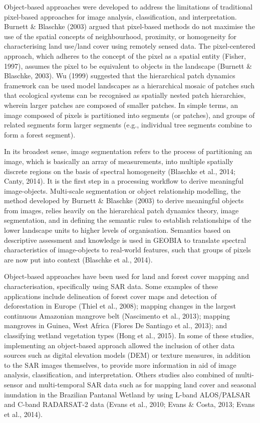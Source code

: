 Object-based approaches were developed to address the limitations of traditional pixel-based approaches for image analysis, classification, and interpretation. Burnett \& Blaschke (2003) argued that pixel-based methods do not maximise the use of the spatial concepts of neighbourhood, proximity, or homogeneity for characterising land use/land cover using remotely sensed data. The pixel-centered approach, which adheres to the concept of the pixel as a spatial entity (Fisher, 1997), assumes the pixel to be equivalent to objects in the landscape (Burnett \& Blaschke, 2003). Wu (1999) suggested that the hierarchical patch dynamics framework can be used model landscapes as a hierarchical mosaic of patches such that ecological systems can be recognised as spatially nested patch hierarchies, wherein larger patches are composed of smaller patches. In simple terms, an image composed of pixels is partitioned into segments (or patches), and groups of related segments form larger segments (e.g., individual tree segments combine to form a forest segment).

In its broadest sense, image segmentation refers to the process of partitioning an image, which is basically an array of measurements, into multiple spatially discrete regions on the basis of spectral homogeneity (Blaschke et al., 2014; Canty, 2014). It is the first step in a processing workflow to derive meaningful image-objects. Multi-scale segmentation or object relationship modelling, the method developed by Burnett \& Blaschke (2003) to derive meaningful objects from images, relies heavily on the hierarchical patch dynamics theory, image segmentation, and in defining the semantic rules to establish relationships of the lower landscape units to higher levels of organisation. Semantics based on descriptive assessment and knowledge is used in GEOBIA to translate spectral characteristics of image-objects to real-world features, such that groups of pixels are now put into context (Blaschke et al., 2014).

Object-based approaches have been used for land and forest cover mapping and characterisation, specifically using SAR data. Some examples of these applications include delineation of forest cover maps and detection of deforestation in Europe (Thiel et al., 2008); mapping changes in the largest continuous Amazonian mangrove belt (Nascimento et al., 2013); mapping mangroves in Guinea, West Africa (Flores De Santiago et al., 2013); and classifying wetland vegetation types (Hong et al., 2015). In some of these studies, implementing an object-based approach allowed the inclusion of other data sources such as digital elevation models (DEM) or texture measures, in addition to the SAR images themselves, to provide more information in aid of image analysis, classification, and interpretation. Others studies also combined of multi-sensor and multi-temporal SAR data such as for mapping land cover and seasonal inundation in the Brazilian Pantanal Wetland by using L-band ALOS/PALSAR and C-band RADARSAT-2 data (Evans et al., 2010; Evans \& Costa, 2013; Evans et al., 2014).

